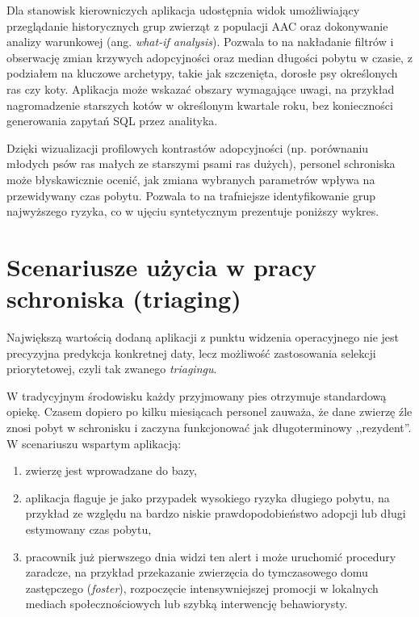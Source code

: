 Dla stanowisk kierowniczych aplikacja udostępnia widok umożliwiający przeglądanie historycznych grup zwierząt z populacji AAC oraz dokonywanie analizy warunkowej (ang. \emph{what-if analysis}). Pozwala to na nakładanie filtrów i obserwację zmian krzywych adopcyjności oraz median długości pobytu w czasie, z podziałem na kluczowe archetypy, takie jak szczenięta, dorosłe psy określonych ras czy koty. Aplikacja może wskazać obszary wymagające uwagi, na przykład nagromadzenie starszych kotów w określonym kwartale roku, bez konieczności generowania zapytań SQL przez analityka.

Dzięki wizualizacji profilowych kontrastów adopcyjności (np. porównaniu młodych psów ras małych ze starszymi psami ras dużych), personel schroniska może błyskawicznie ocenić, jak zmiana wybranych parametrów wpływa na przewidywany czas pobytu. Pozwala to na trafniejsze identyfikowanie grup najwyższego ryzyka, co w ujęciu syntetycznym prezentuje poniższy wykres.



\section{Scenariusze użycia w pracy schroniska (triaging)}
\label{sec:scenariusze-uzycia-triaging}

Największą wartością dodaną aplikacji z punktu widzenia operacyjnego nie jest precyzyjna predykcja konkretnej daty, lecz możliwość zastosowania selekcji priorytetowej, czyli tak zwanego \emph{triagingu}.

W tradycyjnym środowisku każdy przyjmowany pies otrzymuje standardową opiekę. Czasem dopiero po kilku miesiącach personel zauważa, że dane zwierzę źle znosi pobyt w schronisku i zaczyna funkcjonować jak długoterminowy ,,rezydent''. W scenariuszu wspartym aplikacją:

\begin{enumerate}
    \item zwierzę jest wprowadzane do bazy,
    \item aplikacja flaguje je jako przypadek wysokiego ryzyka długiego pobytu, na przykład ze względu na bardzo niskie prawdopodobieństwo adopcji lub długi estymowany czas pobytu,
    \item pracownik już pierwszego dnia widzi ten alert i może uruchomić procedury zaradcze, na przykład przekazanie zwierzęcia do tymczasowego domu zastępczego (\emph{foster}), rozpoczęcie intensywniejszej promocji w lokalnych mediach społecznościowych lub szybką interwencję behawiorysty.
\end{enumerate}


